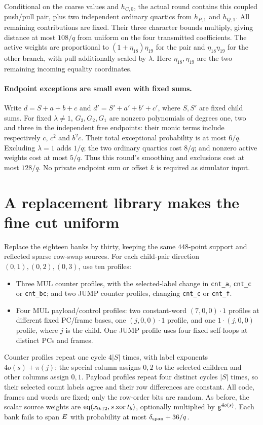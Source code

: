 \documentclass[11pt]{article}
\begin{document}
Conditional on the coarse values and $h_{C,0}$, the actual round contains this coupled push/pull pair, plus two independent ordinary quartics from $h_{P,1}$ and $h_{Q,1}$. All remaining contributions are fixed. Their three character bounds multiply, giving distance at most $108/q$ from uniform on the four transmitted coefficients. The active weights are proportional to $(1+\eta_{18})\eta_{19}$ for the pair and $\eta_{18}\eta_{19}$ for the other branch, with pull additionally scaled by $\lambda$. Here $\eta_{18},\eta_{19}$ are the two remaining incoming equality coordinates.

\paragraph{Endpoint exceptions are small even with fixed sums.} Write $d=S+a+b+c$ and $d'=S'+a'+b'+c'$, where $S,S'$ are fixed child sums. For fixed $\lambda\ne1$, $G_3,G_2,G_1$ are nonzero polynomials of degrees one, two and three in the independent free endpoints: their monic terms include respectively $c$, $c^2$ and $b^2c$. Their total exceptional probability is at most $6/q$. Excluding $\lambda=1$ adds $1/q$; the two ordinary quartics cost $8/q$; and nonzero active weights cost at most $5/q$. Thus this round's smoothing and exclusions cost at most $128/q$. No private endpoint sum or offset $k$ is required as simulator input.

\section{A replacement library makes the fine cut uniform}

Replace the eighteen banks by thirty, keeping the same $448$-point support and reflected sparse row-swap sources. For each child-pair direction $(0,1),(0,2),(0,3)$, use ten profiles:
\begin{itemize}
\item Three MUL counter profiles, with the selected-label change in \texttt{cnt\_a}, \texttt{cnt\_c} or \texttt{cnt\_bc}; and two JUMP counter profiles, changing \texttt{cnt\_c} or \texttt{cnt\_f}.
\item Four MUL payload/control profiles: two constant-word $(7,0,0)\cdot1$ profiles at different fixed PC/frame bases, one $(j,0,0)\cdot1$ profile, and one $1\cdot(j,0,0)$ profile, where $j$ is the child. One JUMP profile uses four fixed self-loops at distinct PCs and frames.
\end{itemize}
Counter profiles repeat one cycle $4|S|$ times, with label exponents $4o(s)+\pi(j)$; the special column assigns $0,2$ to the selected children and other columns assign $0,1$. Payload profiles repeat four distinct cycles $|S|$ times, so their selected count labels agree and their row differences are constant. All code, frames and words are fixed; only the row-order bits are random. As before, the scalar source weights are $\operatorname{eq}(x_{0:12},s\mathbin{\mathrm{xor}}t_b)$, optionally multiplied by $\mathsf{g}^{4o(s)}$. Each bank fails to span $E$ with probability at most $\delta_{\rm span}+36/q$.
\end{document}
